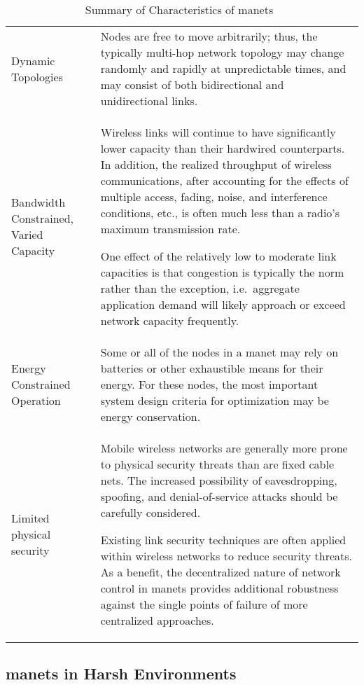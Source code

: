 \begin{table}[h!]
\caption[Summary of Characteristics of \glspl{manet}]{Summary of Characteristics of \glspl{manet}~\citet{Corson1999}}
\label{tab:manet_characteristics}
  \begin{tabularx}{\textwidth}{p{2cm}X}\toprule
    Dynamic Topologies & Nodes are free to move arbitrarily; thus, the typically multi-hop network topology may change randomly and rapidly at unpredictable times, and may consist of both bidirectional and unidirectional links.
\\
    Bandwidth Constrained, Varied Capacity & Wireless links will continue to have significantly lower capacity than their hardwired counterparts.
In addition, the realized throughput of wireless communications, after accounting for the effects of multiple access, fading, noise, and interference conditions, etc., is often much less than a radio's maximum transmission rate.
\par
One effect of the relatively low to moderate link capacities is that congestion is typically the norm rather than the exception, i.e.\  aggregate application demand will likely approach or exceed network capacity frequently.\\
    Energy Constrained Operation &  Some or all of the nodes in a \gls{manet} may rely on batteries or other exhaustible means for their energy.
For these nodes, the most important system design criteria for optimization may be energy conservation.\\
    Limited physical security & Mobile wireless networks are generally more prone to physical security threats than are fixed cable nets.
The increased possibility of eavesdropping, spoofing, and denial-of-service attacks should be carefully considered.\par
Existing link security techniques are often applied within wireless networks to reduce security threats.
As a benefit, the decentralized nature of network control in \glspl{manet} provides additional robustness against the single points of failure of more centralized approaches.\\\bottomrule
\end{tabularx}
\end{table}


\subsection{\glspl{manet} in Harsh Environments}

